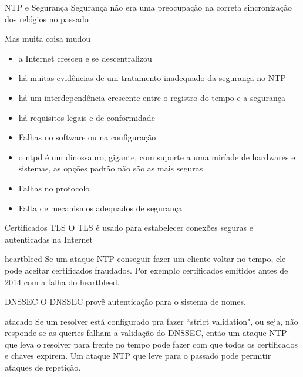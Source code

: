 \documentclass{if-beamer}
\begin{document}
\begin{frame}[allowframebreaks]{NTP e Segurança}
	Segurança não era uma preocupação na correta sincronização dos relógios no passado
	\begin{block}{Mas muita coisa mudou}
		\begin{itemize}
			\item a Internet cresceu e se descentralizou
			\item há muitas evidências de um tratamento inadequado da segurança no NTP
			\item há um interdependência crescente entre o registro do tempo e a segurança
			\item há requisitos legais e de conformidade
		\end{itemize}
	\end{block}
	\framebreak
\begin{itemize}	
	\item Falhas no software ou na configuração
	\item o ntpd é um dinossauro, gigante, com suporte a uma miríade de hardwares e sistemas, as opções padrão não são as mais seguras
	\item Falhas no protocolo
	\item Falta de mecanismos adequados de segurança
\end{itemize}
\end{frame}


\begin{frame}{Certificados TLS}
O TLS é usado para estabelecer conexões seguras e autenticadas na Internet
\begin{block}{heartbleed}
 Se um ataque NTP conseguir fazer um cliente voltar no tempo, ele pode aceitar certificados fraudados. Por exemplo certificados emitidos antes de 2014 com a falha do heartbleed.
\end{block}
\end{frame}

\begin{frame}{DNSSEC}
O DNSSEC provê autenticação para o sistema de nomes. 
\begin{block}{atacado}
Se um resolver está configurado pra fazer ``strict validation", ou seja, não responde se as queries falham a validação do DNSSEC, então um ataque NTP que leva o resolver para frente no tempo pode fazer com que todos os certificados e chaves expirem. Um ataque NTP que leve para o passado pode permitir ataques de repetição.
\end{block}

\end{frame}
\end{document}
